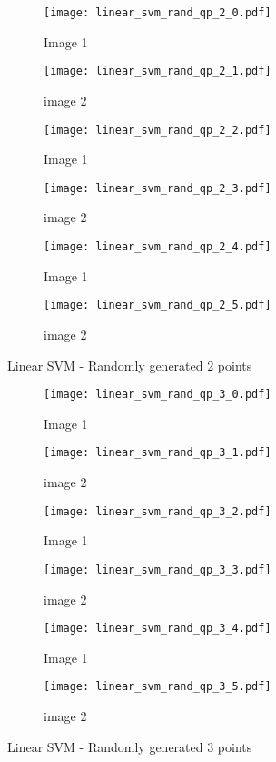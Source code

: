 \documentclass[10pt, a4paper,reqno]{amsart}
\begin{document}
\begin{figure}[H]
	\centering	
	\begin{subfigure}{0.5\textwidth}
		\centering
		\texttt{[image: linear\_svm\_rand\_qp\_2\_0.pdf]}
		\caption{Image 1}
	\end{subfigure}%
	\begin{subfigure}{0.5\textwidth}
		\centering
		\texttt{[image: linear\_svm\_rand\_qp\_2\_1.pdf]}
		\caption{image 2}
	\end{subfigure}
	\begin{subfigure}{0.5\textwidth}
		\centering
		\texttt{[image: linear\_svm\_rand\_qp\_2\_2.pdf]}
		\caption{Image 1}
	\end{subfigure}%
	\begin{subfigure}{0.5\textwidth}
		\centering
		\texttt{[image: linear\_svm\_rand\_qp\_2\_3.pdf]}
		\caption{image 2}
	\end{subfigure}
	\begin{subfigure}{0.5\textwidth}
		\centering
		\texttt{[image: linear\_svm\_rand\_qp\_2\_4.pdf]}
		\caption{Image 1}
	\end{subfigure}%
	\begin{subfigure}{0.5\textwidth}
		\centering
		\texttt{[image: linear\_svm\_rand\_qp\_2\_5.pdf]}
		\caption{image 2}
	\end{subfigure}
	\caption{Linear SVM - Randomly generated 2 points}
\end{figure}

\begin{figure}[H]
	\centering	
	\begin{subfigure}{0.5\textwidth}
		\centering
		\texttt{[image: linear\_svm\_rand\_qp\_3\_0.pdf]}
		\caption{Image 1}
	\end{subfigure}%
	\begin{subfigure}{0.5\textwidth}
		\centering
		\texttt{[image: linear\_svm\_rand\_qp\_3\_1.pdf]}
		\caption{image 2}
	\end{subfigure}
	\begin{subfigure}{0.5\textwidth}
		\centering
		\texttt{[image: linear\_svm\_rand\_qp\_3\_2.pdf]}
		\caption{Image 1}
	\end{subfigure}%
	\begin{subfigure}{0.5\textwidth}
		\centering
		\texttt{[image: linear\_svm\_rand\_qp\_3\_3.pdf]}
		\caption{image 2}
	\end{subfigure}
	\begin{subfigure}{0.5\textwidth}
		\centering
		\texttt{[image: linear\_svm\_rand\_qp\_3\_4.pdf]}
		\caption{Image 1}
	\end{subfigure}%
	\begin{subfigure}{0.5\textwidth}
		\centering
		\texttt{[image: linear\_svm\_rand\_qp\_3\_5.pdf]}
		\caption{image 2}
	\end{subfigure}
	\caption{Linear SVM - Randomly generated 3 points}
\end{figure}
\end{document}
